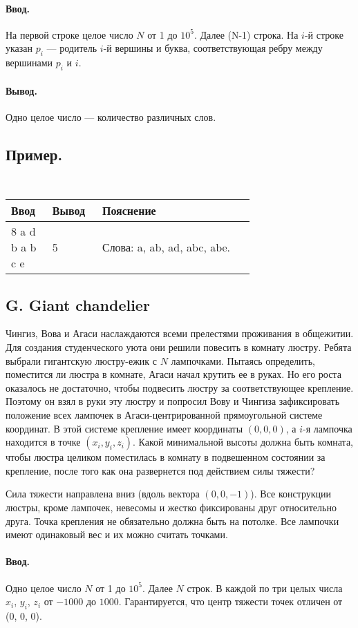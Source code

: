 \documentclass[12pt, a4paper]{article}
\newcommand{\informat}[1]
{
	\paragraph{Ввод.\\} #1
}
\newcommand{\outformat}[1]
{
	\paragraph{Вывод.\\} #1
}
\newcommand{\examplepic}[3]
{
	\subsection*{Пример.}
	{\tt
	\noindent
	\begin{tabular}{|p{0.1\linewidth}|p{0.1\linewidth}|p{0.5\linewidth}|}
	\hline
	Ввод 	& Вывод  	& Пояснение\\
	\hline
	#1 		& #2 		& #3\\
	\hline
	\end{tabular}
	}
}
\begin{document}
\informat{На первой строке целое число $N$ от 1 до $10^5$. Далее (N-1) строка. На $i$-й строке указан $p_i$ --- родитель $i$-й вершины и буква, соответствующая ребру между вершинами $p_i$ и $i$.}


\outformat{Одно целое число --- количество различных слов.}

\examplepic{
8 \newline
1 a \newline
5 d \newline
5 b \newline
1 a \newline
2 b \newline
6 c \newline
4 e
}{5}{Слова: a, ab, ad, abc, abe. \newline 
}





\subsection*{G. Giant chandelier}
 

Чингиз, Вова и Агаси наслаждаются всеми прелестями проживания в общежитии. Для создания студенческого уюта они решили повесить в комнату люстру. Ребята выбрали гигантскую люстру-ежик с $N$ лампочками. Пытаясь определить, поместится ли люстра в комнате, Агаси начал крутить ее в руках. Но его роста оказалось не достаточно, чтобы подвесить люстру за соответствующее крепление. Поэтому он взял в руки эту люстру и попросил Вову и Чингиза зафиксировать положение всех лампочек в Агаси-центрированной прямоугольной системе координат. В этой системе крепление имеет координаты $(0, 0, 0)$, а $i$-я лампочка находится в точке $(x_i, y_i, z_i)$. Какой минимальной высоты должна быть комната, чтобы люстра целиком поместилась в комнату в подвешенном состоянии за крепление, после того как она развернется под действием силы тяжести?

Сила тяжести направлена вниз (вдоль вектора $(0, 0, -1)$). Все конструкции люстры, кроме лампочек, невесомы и жестко фиксированы друг относительно друга. Точка крепления не обязательно должна быть на потолке. Все лампочки имеют одинаковый вес и их можно считать точками. 

\informat{Одно целое число $N$ от 1 до $10^5$. Далее $N$ строк. В каждой по три целых числа $x_i$, $y_i$, $z_i$ от $-1000$ до $1000$. Гарантируется, что центр тяжести точек отличен от (0, 0, 0).}
\end{document}
